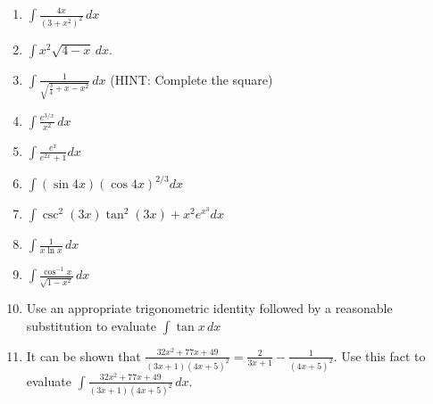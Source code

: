 \documentclass[12pt]{article}
\newif\ifans
\begin{document}
\begin{enumerate}
\item $\int \frac{4x}{(3+x^2)^2} \,dx$ 

\ifans{\fbox{$-2(3+x^2)^{-1}+C$}} \fi

\item $\int x^2\sqrt{4-x} \,dx$. 

\ifans{\fbox{$-\frac{32}{3}(4-x)^{3/2}+\frac{16}{5}(4-x)^{5/2}-\frac{2}{7}(4-x)^{7/2}+C$}} \fi

\item $\int \frac{1}{\sqrt{\frac{3}{4}+x-x^2}} \,dx$ (HINT: Complete the square)

\ifans{\fbox{$\arcsin{\left(x-\frac{1}{2}\right)}+C$}} \fi

\item $\int{\frac{e^{3/x}}{x^2}} \,dx$

\ifans{\fbox{$-\frac{1}{3}e^{3/x}+C$}} \fi

\item $\int \frac{e^x}{e^{2x}+1}dx$ 

\ifans{\fbox{$\tan^{-1}{(e^x)}+C$}} \fi

\item $\int (\sin{4x})(\cos{4x})^{2/3}dx$ 

\ifans{\fbox{$-\frac{3}{20}(\cos{4x})^{5/3}+C$}} \fi

\item $\int \csc^{2}{(3x)}\tan^{2}{(3x)}+x^2e^{x^3}dx$ 

\ifans{\fbox{$\frac{1}{3}\tan{(3x)}+\frac{1}{3}e^{x^3}+C$}} \fi

\item $\int \frac{1}{x\ln{x}} \,dx$

\ifans{\fbox{$\ln{|\ln{x}|}+C$}} \fi

\item $\int{\frac{\cos^{-1}{x}}{\sqrt{1-x^2}}} \,dx$

\ifans{\fbox{$-\frac{1}{2}\left(\cos^{-1}{x}\right)^2+C$}} \fi

\item Use an appropriate trigonometric identity followed by a reasonable substitution to evaluate $\int \tan{x} \,dx$

\ifans{\fbox{$\ln{|\sec{x}|}+C$}} \fi

\item It can be shown that $\frac{32x^2+77x+49}{(3x+1)(4x+5)^2}=\frac{2}{3x+1}-\frac{1}{(4x+5)^2}$.  Use this fact to evaluate $\int{\frac{32x^2+77x+49}{(3x+1)(4x+5)^2}} \,dx$.

\ifans{\fbox{$\frac{2}{3}\ln{|3x+1|}+\frac{1}{4(4x+5)}+C$}} \fi


\end{enumerate}
\end{document}
